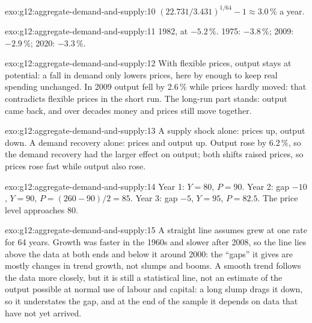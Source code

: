 \begin{solution}{exo:g12:aggregate-demand-and-supply:10}
$(22.731/3.431)^{1/64} - 1 \approx 3.0\,\%$ a year.
\end{solution}

\begin{solution}{exo:g12:aggregate-demand-and-supply:11}
1982, at $-5.2\,\%$. 1975: $-3.8\,\%$; 2009: $-2.9\,\%$; 2020: $-3.3\,\%$.
\end{solution}

\begin{solution}{exo:g12:aggregate-demand-and-supply:12}
With flexible prices, output stays at potential: a fall in demand only lowers prices, here by enough to keep real spending unchanged. In 2009 output fell by 2.6\,\% while prices
hardly moved: that contradicts flexible prices in the short run. The long-run part stands: output came back, and over decades money and prices still move together.
\end{solution}

\begin{solution}{exo:g12:aggregate-demand-and-supply:13}
A supply shock alone: prices up, output down. A demand recovery alone: prices and output up. Output rose by 6.2\,\%, so the demand recovery had the larger effect on output;
both shifts raised prices, so prices rose fast while output also rose.
\end{solution}

\begin{solution}{exo:g12:aggregate-demand-and-supply:14}
Year 1: $Y = 80$, $P = 90$. Year 2: gap $-10$, $Y = 90$, $P = (260 - 90)/2 = 85$. Year 3: gap $-5$, $Y = 95$, $P = 82.5$. The price level approaches 80.
\end{solution}

\begin{solution}{exo:g12:aggregate-demand-and-supply:15}
A straight line assumes  grew at one rate for 64 years. Growth was faster in the 1960s and slower after 2008, so the line lies above the data at both ends and
below it around 2000: the ``gaps'' it gives are mostly changes in trend growth, not slumps and booms. A smooth trend follows the data more closely, but it is still a
statistical line, not an estimate of the output possible at normal use of labour and capital: a long slump drags it down, so it understates the gap, and at the end of the
sample it depends on data that have not yet arrived.
\end{solution}


